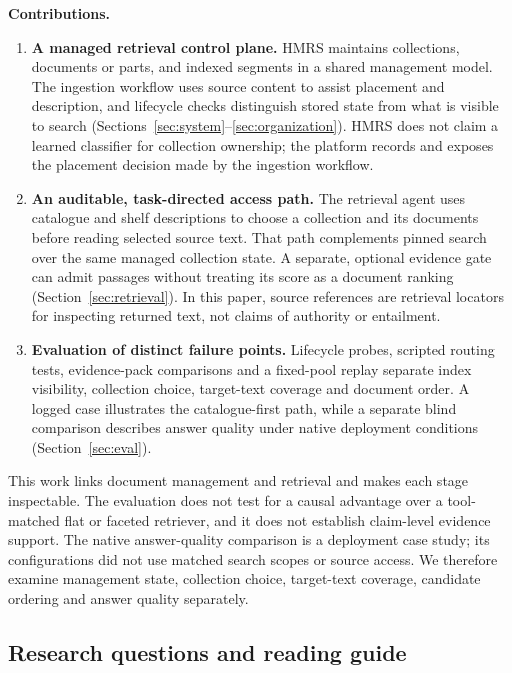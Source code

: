 \ifdefined\HMRSReviewLayout{}\fi
\noindent\textbf{Contributions.}
\begin{enumerate}
\item \textbf{A managed retrieval control plane.} HMRS maintains
collections, documents or parts, and indexed segments in a shared management
model. The ingestion workflow uses source content to assist placement and
description, and lifecycle checks distinguish stored state from what is visible
to search (Sections~\ref{sec:system}--\ref{sec:organization}). HMRS does not
claim a learned classifier for collection ownership; the platform records and
exposes the placement decision made by the ingestion workflow.
\item \textbf{An auditable, task-directed access path.} The retrieval
agent uses catalogue and shelf descriptions to choose a collection and its
documents before reading selected source text. That path complements pinned
search over the same managed collection state. A separate, optional evidence
gate can admit passages without treating its score as a document ranking
(Section~\ref{sec:retrieval}). In this paper, source references are retrieval
locators for inspecting returned text, not claims of authority or entailment.
\item \textbf{Evaluation of distinct failure points.} Lifecycle probes,
scripted routing tests, evidence-pack comparisons and a fixed-pool replay
separate index visibility, collection choice, target-text coverage and
document order. A logged case illustrates the catalogue-first path, while
a separate blind comparison describes answer quality under native deployment
conditions (Section~\ref{sec:eval}).
\end{enumerate}

This work links document management and retrieval and makes each stage
inspectable. The evaluation does not test for a causal advantage over a
tool-matched flat or faceted retriever, and it does not establish claim-level
evidence support. The native answer-quality comparison is a deployment case
study; its configurations did not use matched search scopes or source access.
We therefore examine management state, collection choice, target-text coverage,
candidate ordering and answer quality separately.

\subsection{Research questions and reading guide}
\label{sec:rq}

